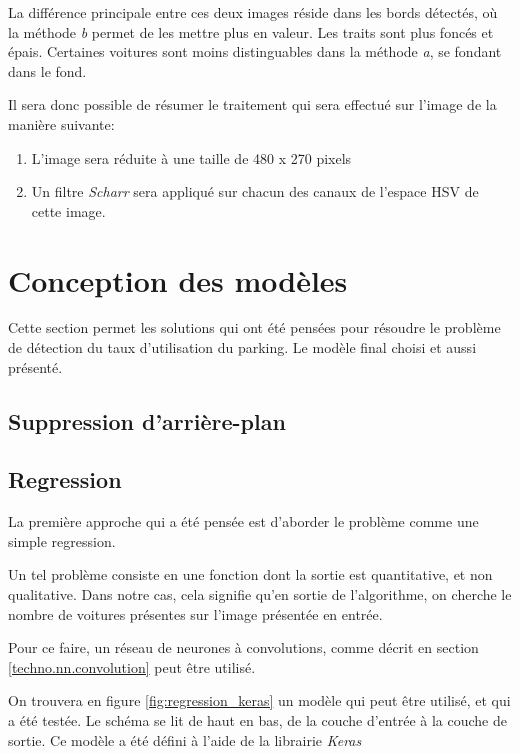 La différence principale entre ces deux images réside dans les bords détectés, où la méthode \textit{b} permet de les mettre plus en valeur. Les traits sont plus foncés et épais. Certaines voitures sont moins distinguables dans la méthode \textit{a}, se fondant dans le fond.

Il sera donc possible de résumer le traitement qui sera effectué sur l'image de la manière suivante:
\begin{enumerate}
    \item L'image sera réduite à une taille de 480 x 270 pixels
    \item Un filtre \textit{Scharr} sera appliqué sur chacun des canaux de l'espace HSV de cette image.
\end{enumerate}


\section{Conception des modèles}

Cette section permet les solutions qui ont été pensées pour résoudre le problème de détection du taux d'utilisation du parking. Le modèle final choisi et aussi présenté. 

\subsection{Suppression d'arrière-plan}


\subsection{Regression}\label{conception.model.regression}
La première approche qui a été pensée est d'aborder le problème comme une simple regression.

Un tel problème consiste en une fonction dont la sortie est quantitative, et non qualitative\autocite{wiki:regression}. Dans notre cas, cela signifie qu'en sortie de l'algorithme, on cherche le nombre de voitures présentes sur l'image présentée en entrée. 

Pour ce faire, un réseau de neurones à convolutions, comme décrit en section \ref{techno.nn.convolution}  peut être utilisé. 

On trouvera en figure \ref{fig:regression_keras} un modèle qui peut être utilisé, et qui a été testée. Le schéma se lit de haut en bas, de la couche d'entrée à la couche de sortie. Ce modèle a été défini à l'aide de la librairie \textit{Keras}

